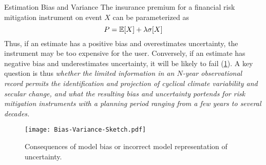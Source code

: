 \begin{block}{Estimation Bias and Variance}
    The insurance premium for a financial risk mitigation instrument on event $X$ can be parameterized as
    \begin{equation*}
        P = \mathbb{E}\qty[X] + \lambda \sigma \qty[X]
    \end{equation*}
    Thus, if an estimate has a positive bias and overestimates uncertainty, the instrument may be too expensive for the user.
    Conversely, if an estimate has negative bias and underestimates uncertainty, it will be likely to fail (\cref{fig:conceptual-bias-variance}).
    A key question is thus \emph{whether the limited information in an $N$-year observational record permits the identification and projection of cyclical climate variability and secular change, and what the resulting bias and uncertainty portends for risk mitigation instruments with a planning period ranging from a few years to several decades.}
    \begin{figure}
        \centering
        \texttt{[image: Bias-Variance-Sketch.pdf]}
        \caption{
        Consequences of model bias or incorrect model representation of uncertainty.
        }\label{fig:conceptual-bias-variance}
    \end{figure}
\end{block}